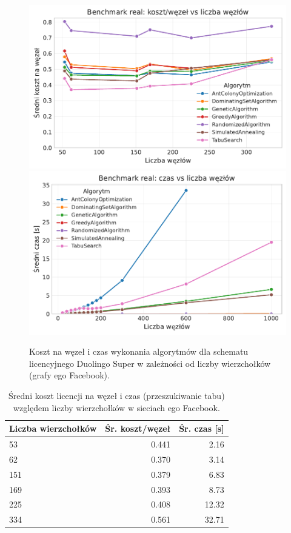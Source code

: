 \begin{figure}[H]
  \centering
  \includegraphics[width=0.48\linewidth]{assets/figures/benchmark/real/cost_per_node_vs_nodes.pdf}
  \hfill
  \includegraphics[width=0.48\linewidth]{assets/figures/benchmark/real/time_vs_nodes.pdf}
  \caption{Koszt na węzeł i czas wykonania algorytmów dla schematu licencyjnego Duolingo Super w zależności od liczby wierzchołków (grafy ego Facebook).}
  \label{fig:duo-real-size}
\end{figure}

\begin{table}[H]
  \centering
  \caption{Średni koszt licencji na węzeł i czas (przeszukiwanie tabu) względem liczby wierzchołków w sieciach ego Facebook.}
  \label{tab:duo-real-size-table}
  \begin{tabular}{lrr}
    \toprule
    \textbf{Liczba wierzchołków} & \textbf{Śr. koszt/węzeł} & \textbf{Śr. czas [s]} \\
    \midrule
    53                           & 0.441                    & 2.16                  \\
    62                           & 0.370                    & 3.14                  \\
    151                          & 0.379                    & 6.83                  \\
    169                          & 0.393                    & 8.73                  \\
    225                          & 0.408                    & 12.32                 \\
    334                          & 0.561                    & 32.71                 \\
    \bottomrule
  \end{tabular}
\end{table}


